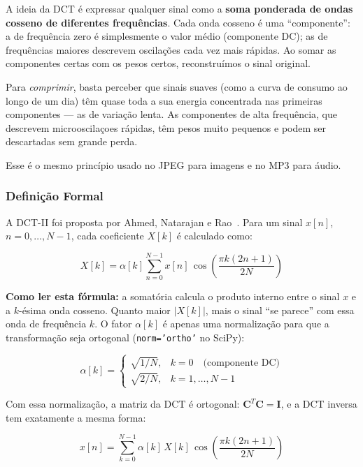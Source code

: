 \documentclass[12pt, a4paper]{article}
\begin{document}
A ideia da DCT é expressar qualquer sinal como a \textbf{soma ponderada de ondas cosseno de diferentes frequências}. Cada onda cosseno é uma ``componente'': a de frequência zero é simplesmente o valor médio (componente DC); as de frequências maiores descrevem oscilações cada vez mais rápidas. Ao somar as componentes certas com os pesos certos, reconstruímos o sinal original.

Para \emph{comprimir}, basta perceber que sinais suaves (como a curva de consumo ao longo de um dia) têm quase toda a sua energia concentrada nas primeiras componentes — as de variação lenta. As componentes de alta frequência, que descrevem microoscilaçoes rápidas, têm pesos muito pequenos e podem ser descartadas sem grande perda.

Esse é o mesmo princípio usado no JPEG para imagens e no MP3 para áudio.

\subsubsection{Definição Formal}

A DCT-II foi proposta por Ahmed, Natarajan e Rao~\cite{ahmed1974dct}. Para um sinal $x[n]$, $n = 0, \ldots, N-1$, cada coeficiente $X[k]$ é calculado como:

\begin{equation}
    X[k] = \alpha[k] \sum_{n=0}^{N-1} x[n]\,\cos\!\left(\frac{\pi k (2n+1)}{2N}\right)
\end{equation}

\textbf{Como ler esta fórmula:} a somatória calcula o produto interno entre o sinal $x$ e a $k$-ésima onda cosseno. Quanto maior $|X[k]|$, mais o sinal ``se parece'' com essa onda de frequência $k$. O fator $\alpha[k]$ é apenas uma normalização para que a transformação seja ortogonal (\texttt{norm='ortho'} no SciPy):

\begin{equation}
    \alpha[k] =
    \begin{cases}
        \sqrt{1/N}, & k = 0 \quad \text{(componente DC)}\\[4pt]
        \sqrt{2/N}, & k = 1, \ldots, N-1
    \end{cases}
\end{equation}

Com essa normalização, a matriz da DCT é ortogonal: $\mathbf{C}^T \mathbf{C} = \mathbf{I}$, e a DCT inversa tem exatamente a mesma forma:

\begin{equation}
    x[n] = \sum_{k=0}^{N-1} \alpha[k]\, X[k]\,\cos\!\left(\frac{\pi k (2n+1)}{2N}\right)
\end{equation}
\end{document}
